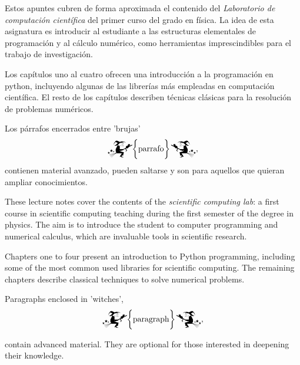 \begin{paracol}{2}
Estos apuntes cubren de forma aproximada  el contenido del \emph{Laboratorio de computación científica} del primer curso del grado en física.
La idea de esta asignatura es  introducir al estudiante a las estructuras elementales de programación y al cálculo numérico, como herramientas imprescindibles para el trabajo de investigación.

Los capítulos uno al cuatro ofrecen una introducción a la programación en python, incluyendo algunas de las librerías más empleadas en computación científica. El resto de los capítulos describen técnicas clásicas para la resolución de problemas numéricos.

Los párrafos encerrados entre 'brujas'
\begin{equation*}
	\mathwitch* \biggl \{ \text{parrafo} \biggr \} \reversemathwitch*,
\end{equation*}
contienen material avanzado, pueden saltarse y son para aquellos que quieran ampliar conocimientos.

\switchcolumn
These lecture notes cover the contents  of the \emph{scientific computing lab}: a first course in scientific computing teaching during the first semester of the degree in physics. The aim is to introduce the student to computer programming and numerical calculus, which are invaluable tools in scientific research.

Chapters one to four present an introduction to Python programming, including some of the most common used libraries for scientific computing. The remaining chapters describe classical techniques to solve numerical problems.

Paragraphs enclosed in 'witches',
\begin{equation*}
\mathwitch* \biggl \{ \text{paragraph} \biggr \}\reversemathwitch*,
\end{equation*}

contain advanced material. They are optional for those interested in deepening their knowledge.
  

\end{paracol}

